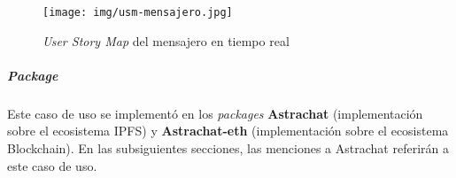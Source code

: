 \begin{figure}[H]
    \centering
    \texttt{[image: img/usm-mensajero.jpg]}
    \caption{\textit{User Story Map} del mensajero en tiempo real}
    \label{fig:enter-label}
\end{figure}

\subparagraph{Package}

Este caso de uso se implementó en los \textit{packages} \textbf{Astrachat} \cite{astrachat-ipfs} (implementación sobre el ecosistema IPFS) y \textbf{Astrachat-eth} \cite{astrachat-eth} (implementación sobre el ecosistema Blockchain). En las subsiguientes secciones, las menciones a Astrachat referirán a este caso de uso.





